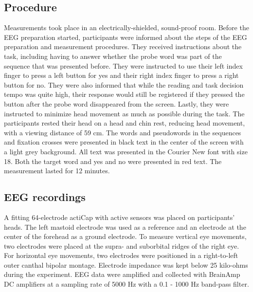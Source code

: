 \subsection*{Procedure}
Measurements took place in an electrically-shielded, sound-proof room. Before the EEG preparation started, participants were informed about the steps of the EEG preparation and measurement procedures. They received instructions about the task, including having to answer whether the probe word was part of the sequence that was presented before. They were instructed to use their left index finger to press a left button for yes and their right index finger to press a right button for no. They were also informed that while the reading and task decision tempo was quite high, their response would still be registered if they pressed the button after the probe word disappeared from the screen. Lastly, they were instructed to minimize head movement as much as possible during the task. The participants rested their head on a head and chin rest, reducing head movement, with a viewing distance of 59 cm. The words and pseudowords in the sequences and fixation crosses were presented in black text in the center of the screen with a light grey background. All text was presented in the Courier New font with size 18. Both the target word and yes and no were presented in red text. The measurement lasted for 12 minutes. 

\subsection*{EEG recordings}
A fitting 64-electrode actiCap with active sensors was placed on participants' heads. The left mastoid electrode was used as a reference and an electrode at the center of the forehead as a ground electrode. To measure vertical eye movements, two electrodes were placed at the supra- and suborbital ridges of the right eye. For horizontal eye movements, two electrodes were positioned in a right-to-left outer canthal bipolar montage. Electrode impedance was kept below 25 kilo-ohms during the experiment. EEG data were amplified and collected with BrainAmp DC amplifiers at a sampling rate of 5000 Hz with a 0.1 - 1000 Hz band-pass filter. 

